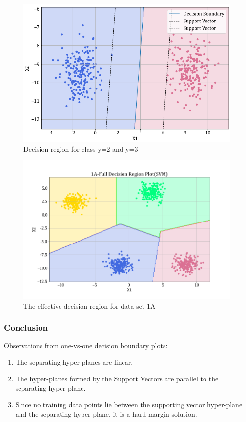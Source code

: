 \documentclass[11pt,a4paper]{article}
\begin{document}
\begin{figure}[H]
    \centering
    \includegraphics[scale=0.55]{images/1A_ovo_23.png}
    \caption{Decision region for class y=2 and y=3}
\end{figure}

\begin{figure}[H]
    \centering
    \includegraphics[scale=0.55]{images/1A_SVM_full_decision_plot.png}
    \caption{The effective decision region for data-set 1A}
\end{figure}

\subsubsection{Conclusion}
Observations from one-vs-one decision boundary plots:
\begin{enumerate}
    \item The separating hyper-planes are linear.
    \item The hyper-planes formed by the Support Vectors are parallel to the separating hyper-plane. 
    \item Since no training data points lie between the supporting vector hyper-plane and the separating hyper-plane, it is a hard margin solution. 
\end{enumerate}
\end{document}

